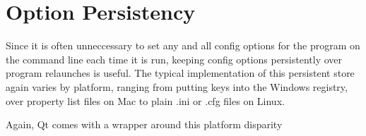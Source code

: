 \section{Option Persistency}
Since it is often unneccessary to set any and all config options for the program on the command line each time it is run, keeping config options persistently over program relaunches is useful. The typical implementation of this persistent store again varies by platform, ranging from putting keys into the Windows registry, over property list files on Mac to plain .ini or .cfg files on Linux.

Again, Qt comes with a wrapper around this platform disparity
